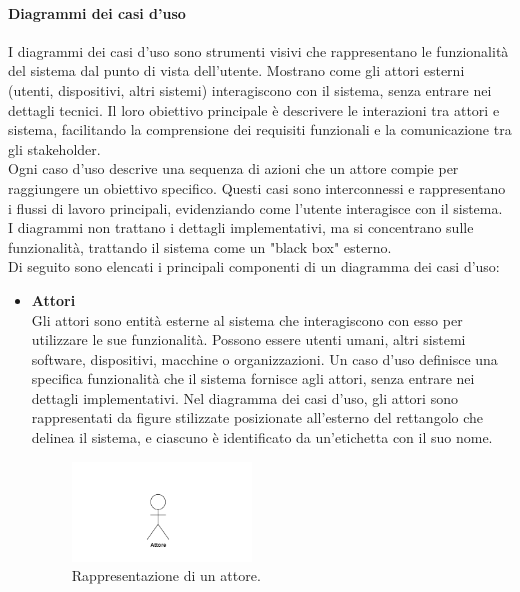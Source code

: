 \documentclass[10pt]{article}
\begin{document}
\begin{justify}
        \paragraph{Diagrammi dei casi d'uso} 
        I diagrammi dei casi d'uso sono strumenti visivi che rappresentano le funzionalità del sistema dal punto di vista dell'utente. Mostrano come gli attori esterni (utenti, dispositivi, altri sistemi) interagiscono con il sistema, senza entrare nei dettagli tecnici. Il loro obiettivo principale è descrivere le interazioni tra attori e sistema, facilitando la comprensione dei requisiti funzionali e la comunicazione tra gli stakeholder.\\ 
        Ogni caso d'uso descrive una sequenza di azioni che un attore compie per raggiungere un obiettivo specifico. Questi casi sono interconnessi e rappresentano i flussi di lavoro principali, evidenziando come l'utente interagisce con il sistema. I diagrammi non trattano i dettagli implementativi, ma si concentrano sulle funzionalità, trattando il sistema come un "black box" esterno.\\
        Di seguito sono elencati i principali componenti di un diagramma dei casi d’uso:
        \begin{itemize}
            \item \textbf{Attori}\\
            Gli attori sono entità esterne al sistema che interagiscono con esso per utilizzare le sue funzionalità. Possono essere utenti umani, altri sistemi software, dispositivi, macchine o organizzazioni. Un caso d'uso definisce una specifica funzionalità che il sistema fornisce agli attori, senza entrare nei dettagli implementativi. Nel diagramma dei casi d'uso, gli attori sono rappresentati da figure stilizzate posizionate all'esterno del rettangolo che delinea il sistema, e ciascuno è identificato da un’etichetta con il suo nome.
            \begin{figure}[H]
            \centering
            \includegraphics[width=0.45\textwidth]{Attore.PNG}
            \caption{Rappresentazione di un attore.}
            \end{figure}


\end{itemize}
\end{justify}
\end{document}
